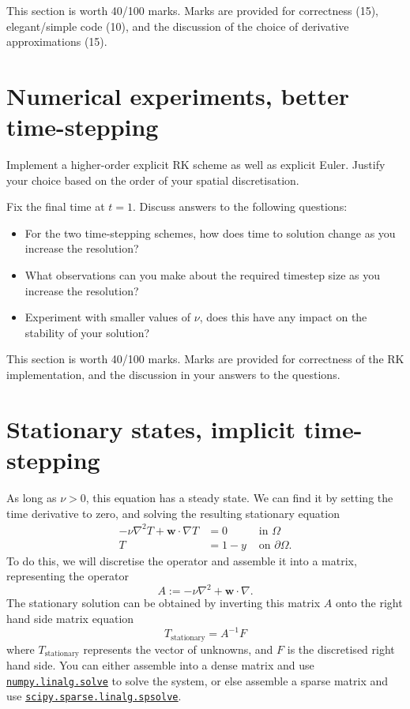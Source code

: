\documentclass[11pt,a4paper]{article}
\renewcommand{\vec}[1]{\ensuremath{\mathbf{#1}}}
\begin{document}
This section is worth 40/100 marks. Marks are provided for
correctness (15), elegant/simple code (10), and the discussion of the
choice of derivative approximations (15).

\section{Numerical experiments, better time-stepping}
\label{sec:part2}

Implement a higher-order explicit RK scheme as well as explicit Euler.
Justify your choice based on the order of your spatial discretisation.

Fix the final time at $t = 1$. Discuss answers to the following
questions:
\begin{itemize}
\item For the two time-stepping schemes, how does time to solution
  change as you increase the resolution?
\item What observations can you make about the required timestep size
  as you increase the resolution?
\item Experiment with smaller values of $\nu$, does this have any
  impact on the stability of your solution?
\end{itemize}

This section is worth 40/100 marks. Marks are provided for
correctness of the RK implementation, and the discussion in your
answers to the questions.

\section{Stationary states, implicit time-stepping}
\label{sec:part3}
As long as $\nu > 0$, this equation has a steady state. We can find it
by setting the time derivative to zero, and solving the resulting
stationary equation
\begin{equation}
  \label{eq:4}
  \begin{aligned}
  -\nu \nabla^2 T + \vec{w} \cdot \nabla T &= 0 &\text{ in } \Omega\\
  T &= 1 - y &\text{ on } \partial\Omega.
  \end{aligned}
\end{equation}
To do this, we will discretise the operator and assemble it into a
matrix, representing the operator
\begin{equation}
  \label{eq:7}
  A := -\nu \nabla^2 + \vec{w} \cdot \nabla.
\end{equation}
The stationary solution can be obtained by inverting this matrix $A$
onto the right hand side
matrix equation
\begin{equation}
  \label{eq:5}
  T_\text{stationary} = A^{-1} F
\end{equation}
where $T_\text{stationary}$ represents the vector of unknowns, and $F$
is the discretised right hand side. You can either assemble into a
dense matrix and use
\href{https://docs.scipy.org/doc/numpy/reference/generated/numpy.linalg.solve.html}{\underline{\texttt{numpy.linalg.solve}}}
to solve the system, or else assemble a sparse matrix and use
\href{https://docs.scipy.org/doc/scipy/reference/sparse.linalg.html}{\underline{\texttt{scipy.sparse.linalg.spsolve}}}.
\end{document}
